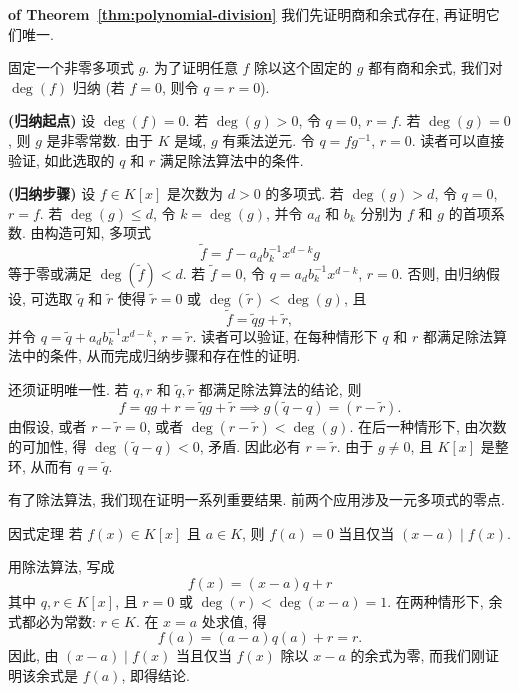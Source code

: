 \begin{Proof}\unskip\textbf{ of Theorem~\ref{thm:polynomial-division}}\quad
  我们先证明商和余式存在, 再证明它们唯一.

  固定一个非零多项式 $g$. 为了证明任意 $f$ 除以这个固定的 $g$ 都有商和余式, 我们对 $\deg(f)$ 归纳 (若 $f=0$, 则令 $q=r=0$).

  \textbf{(归纳起点)} 设 $\deg(f)=0$. 若 $\deg(g)>0$, 令 $q=0$, $r=f$. 若 $\deg(g)=0$, 则 $g$ 是非零常数. 由于 $K$ 是域, $g$ 有乘法逆元. 令 $q=fg^{-1}$, $r=0$. 读者可以直接验证, 如此选取的 $q$ 和 $r$ 满足除法算法中的条件.

  \textbf{(归纳步骤)} 设 $f\in K[x]$ 是次数为 $d>0$ 的多项式. 若 $\deg(g)>d$, 令 $q=0$, $r=f$. 若 $\deg(g)\le d$, 令 $k=\deg(g)$, 并令 $a_{d}$ 和 $b_{k}$ 分别为 $f$ 和 $g$ 的首项系数. 由构造可知, 多项式
  \[
    \widetilde f=f-a_{d}b_{k}^{-1}x^{d-k}g
  \]
  等于零或满足 $\deg(\widetilde f)<d$. 若 $\widetilde f=0$, 令 $q=a_{d}b_{k}^{-1}x^{d-k}$, $r=0$. 否则, 由归纳假设, 可选取 $\widetilde q$ 和 $\widetilde r$ 使得 $\widetilde r=0$ 或 $\deg(\widetilde r)<\deg(g)$, 且
  \[
    \widetilde f=\widetilde qg+\widetilde r,
  \]
  并令 $q=\widetilde q+a_{d}b_{k}^{-1}x^{d-k}$, $r=\widetilde r$. 读者可以验证, 在每种情形下 $q$ 和 $r$ 都满足除法算法中的条件, 从而完成归纳步骤和存在性的证明.

  还须证明唯一性. 若 $q,r$ 和 $\widetilde q,\widetilde r$ 都满足除法算法的结论, 则
  \[
    f=qg+r=\widetilde qg+\widetilde r\implies g(\widetilde q-q)=(r-\widetilde r).
  \]
  由假设, 或者 $r-\widetilde r=0$, 或者 $\deg(r-\widetilde r)<\deg(g)$. 在后一种情形下, 由次数的可加性, 得 $\deg(\widetilde q-q)<0$, 矛盾. 因此必有 $r=\widetilde r$. 由于 $g\ne0$, 且 $K[x]$ 是整环, 从而有 $q=\widetilde q$.
\end{Proof}

有了除法算法, 我们现在证明一系列重要结果. 前两个应用涉及一元多项式的零点.

\begin{Corollary}{因式定理}\label{cor:polynomial-factor-theorem}
  若 $f(x)\in K[x]$ 且 $a\in K$, 则 $f(a)=0$ 当且仅当 $(x-a)\mid f(x)$.
\end{Corollary}

\begin{Proof}
  用除法算法, 写成
  \[
    f(x)=(x-a)q+r
  \]
  其中 $q,r\in K[x]$, 且 $r=0$ 或 $\deg(r)<\deg(x-a)=1$. 在两种情形下, 余式都必为常数: $r\in K$. 在 $x=a$ 处求值, 得
  \[
    f(a)=(a-a)q(a)+r=r.
  \]
  因此, 由 $(x-a)\mid f(x)$ 当且仅当 $f(x)$ 除以 $x-a$ 的余式为零, 而我们刚证明该余式是 $f(a)$, 即得结论.
\end{Proof}

